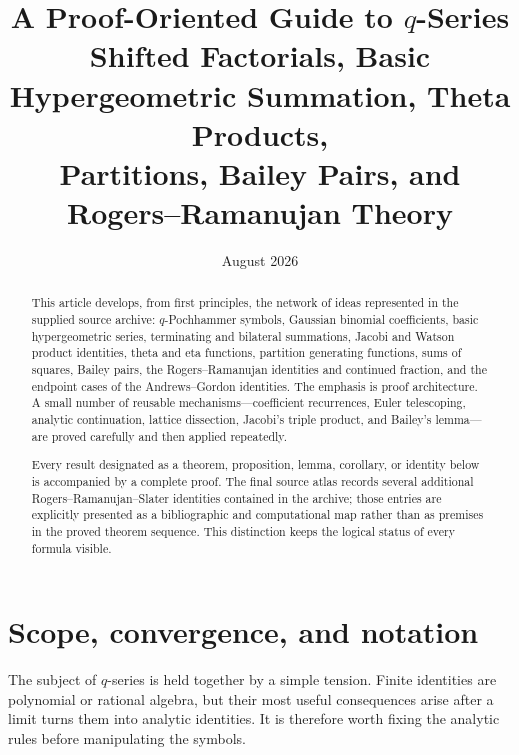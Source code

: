 \documentclass[11pt,oneside]{article}
\title{\bfseries A Proof-Oriented Guide to $q$-Series\\[0.35em]
\large Shifted Factorials, Basic Hypergeometric Summation, Theta Products,\\
Partitions, Bailey Pairs, and Rogers--Ramanujan Theory}
\author{}
\date{August 2026}
\theoremstyle{definition}
\begin{document}
\maketitle

\begin{abstract}
This article develops, from first principles, the network of ideas represented in the supplied source archive: $q$-Pochhammer symbols, Gaussian binomial coefficients, basic hypergeometric series, terminating and bilateral summations, Jacobi and Watson product identities, theta and eta functions, partition generating functions, sums of squares, Bailey pairs, the Rogers--Ramanujan identities and continued fraction, and the endpoint cases of the Andrews--Gordon identities. The emphasis is proof architecture. A small number of reusable mechanisms---coefficient recurrences, Euler telescoping, analytic continuation, lattice dissection, Jacobi's triple product, and Bailey's lemma---are proved carefully and then applied repeatedly.

Every result designated as a theorem, proposition, lemma, corollary, or identity below is accompanied by a complete proof. The final source atlas records several additional Rogers--Ramanujan--Slater identities contained in the archive; those entries are explicitly presented as a bibliographic and computational map rather than as premises in the proved theorem sequence. This distinction keeps the logical status of every formula visible.
\end{abstract}

\begin{center}
\end{center}

\tableofcontents
\clearpage

\section{Scope, convergence, and notation}

The subject of $q$-series is held together by a simple tension. Finite identities are polynomial or rational algebra, but their most useful consequences arise after a limit turns them into analytic identities. It is therefore worth fixing the analytic rules before manipulating the symbols.
\end{document}

